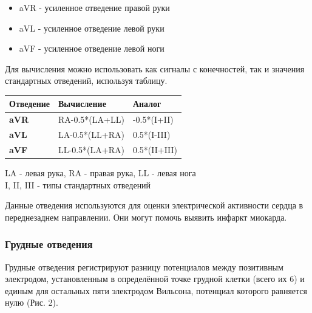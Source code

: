 \documentclass[12pt, russian]{extarticle}
\begin{document}
\begin{spacing}{1.5}
\begin{itemize}
    \item aVR - усиленное отведение правой руки
    \item aVL - усиленное отведение левой руки
    \item aVF - усиленное отведение левой ноги
\end{itemize}

Для вычисления можно использовать как сигналы с конечностей, так и значения стандартных отведений, используя таблицу.

\begin{center}
\begin{tabular}{|l|l|l|}
\hline
\textbf{Отведение} & \textbf{Вычисление} & \textbf{Аналог} \\ \hline
\textbf{aVR}       & RA-0.5*(LA+LL)      & -0.5*(I+II)     \\ \hline
\textbf{aVL}       & LA-0.5*(LL+RA)      & 0.5*(I-III)     \\ \hline
\textbf{aVF}       & LL-0.5*(LA+RA)      & 0.5*(II+III)    \\ \hline
\end{tabular} \bigbreak
LA - левая рука, RA - правая рука, LL - левая нога \\
I, II, III - типы стандартных отведений
\end{center}

Данные отведения используются для оценки электрической активности сердца в переднезаднем направлении. Они могут помочь выявить инфаркт миокарда.

\subsubsection{Грудные отведения}

Грудные отведения регистрируют разницу потенциалов между позитивным электродом, установленным в определённой точке грудной клетки (всего их 6) и единым для остальных пяти электродом Вильсона, потенциал которого равняется нулю (Рис. 2).


\end{spacing}
\end{document}
